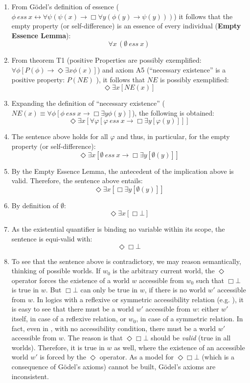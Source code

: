 \documentclass{article}
\newcommand{\imp}{{\rightarrow}}
\newcommand{\biimp}{\leftrightarrow}
\newcommand{\allq}{\forall}
\newcommand{\exq}{\exists}
\newcommand{\Dia}{\Diamond} %
\newcommand{\NE}{\mathit{NE}}
\newcommand{\ess}[2]{#1\ \mathit{ess}\ #2}
\newcommand{\nec}{\Box}
\newcommand{\pos}{\Dia}
\begin{document}
\begin{enumerate}
\item From G\"odel's definition of essence 
(${\ess{\phi}{x} \biimp {\allq \psi} (\psi(x)
\imp {\nec} \allq y (\phi(y) \imp \psi(y)))}$) it follows that the
empty property (or self-difference) is an essence of every individual (\textbf{Empty Essence Lemma}): 
$$\allq x\,(\ess{\emptyset}{x})$$

\item From theorem T1 (positive Properties are possibly
  exemplified: ${\allq \phi} [P(\phi) \imp {\pos}  \exq x
  \phi(x)]$) and axiom A5 (``necessary existence'' is a positive property: $P(\NE)$ ), it follows that $\NE$ is possibly exemplified:
  $$
  \pos \exq x [\NE(x)]
  $$
 
\item Expanding the definition of ``necessary existence''
  (${\NE(x) \equiv \allq \phi [\ess{\phi}{x} \imp \nec \exq y
    \phi(y)]}$), the following is obtained:
  $$
  \pos \exq x [\allq \varphi [ \ess{\varphi}{x} \imp \nec \exq y [\varphi(y)] ] ]
  $$

\item The sentence above holds for all $\varphi$ and thus, in
  particular, for the empty property (or self-difference):
$$
\pos \exq x [ \ess{\emptyset}{x} \imp \nec \exq y [\emptyset(y)] ]
$$

\item By the Empty Essence Lemma, the antecedent of the implication above is valid. Therefore, the sentence above entails:
$$
\pos \exq x [ \nec \exq y [\emptyset(y)] ]
$$ 

\item By definition of $\emptyset$: 
$$
\pos \exq x [ \nec \bot ]
$$

\item As the existential quantifier is binding no variable within its scope, the sentence is equi-valid with:
$$\pos \nec \bot $$

\item To see that the sentence above is contradictory, we may reason semantically, thinking of possible worlds. If $w_0$ is the arbitrary current world, the $\pos$ operator forces the existence of a world $w$ accessible from $w_0$ such that $\nec \bot$ is true in $w$. But $\nec \bot$ can only be true in $w$, if there is no world $w'$ accessible from $w$. In logics with a reflexive or symmetric accessibility relation (e.g. \KB), it is easy to see that there must be a world $w'$ accessible from $w$: either $w'$ itself, in case of a reflexive relation, or $w_0$, in case of a symmetric relation. In fact, even in \K, with no accessibility condition, there must be a world $w'$ accessible from $w$. The reason is that $\pos \nec \bot$ should be \emph{valid} (true in all worlds). Therefore, it is true in $w$ as well, where the existence of an accessible world $w'$ is forced by the $\pos$ operator. As a model for $\pos \nec \bot$ (which is a consequence of G\"odel's axioms) cannot be built, G\"odel's axioms are inconsistent.
\end{enumerate}
\end{document}
